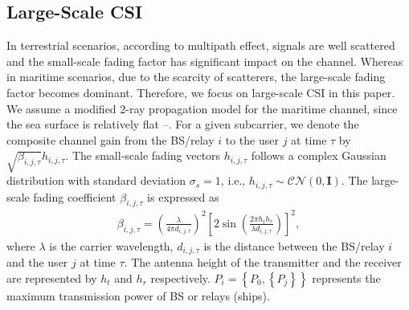 \documentclass[conference]{IEEEtran}
\begin{document}
\subsection{Large-Scale CSI}

In terrestrial scenarios, according to multipath effect, signals are well scattered and the small-scale fading factor has significant impact on the channel. Whereas in maritime scenarios, due to the scarcity of scatterers, the large-scale fading factor becomes dominant. Therefore, we focus on large-scale CSI in this paper.
We assume a modified 2-ray propagation model for the maritime channel, since the sea surface is relatively flat \cite{p0}--\cite{p2}. For a given subcarrier, we denote the composite channel gain from the BS/relay $i$ to the user $j$ at time $\tau $ by $\sqrt {{\beta _{i,j,\tau }}} {h_{i,j,\tau }}$. The small-scale fading vectors ${h_{i,j,\tau }}$ follows a complex Gaussian distribution with standard deviation ${\sigma _s} = 1$, i.e., ${h_{i,j,\tau }} \sim \mathcal{CN}(0, \mathbf{I})$. The large-scale fading coefficient ${\beta _{i,j,\tau }}$ is expressed as
\begin{align}
{\beta _{i,j,\tau }} = {\left( {\frac{\lambda }{{4\pi {d_{i,j,\tau }}}}} \right)^2}{\left[ {2\sin \left( {\frac{{2\pi {h_t}{h_r}}}{{\lambda {d_{i,j,\tau }}}}} \right)} \right]^2} ,
\end{align}
where $\lambda $ is the carrier wavelength, ${d_{i,j,\tau }}$ is the distance between the BS/relay $i$ and the user $j$ at time $\tau $. The antenna height of the transmitter and the receiver are represented by $h_t$ and $h_r$ respectively. $P_i = \left\{ {P_0,\left\{ {P_j} \right\}} \right\}$ represents the maximum transmission power of BS or relays (ships). 
\end{document}
